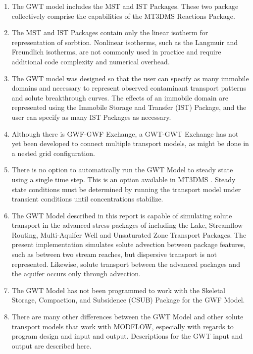 \begin{enumerate}
\item The GWT model includes the MST and IST Packages.  These two package collectively comprise the capabilities of the MT3DMS Reactions Package.

\item The MST and IST Packages contain only the linear isotherm for representation of sorbtion.    Nonlinear isotherms, such as the Langmuir and Freundlich isotherms, are not commonly used in practice and require additional code complexity and numerical overhead. 

\item The GWT model was designed so that the user can specify as many immobile domains and necessary to represent observed contaminant transport patterns and solute breakthrough curves.  The effects of an immobile domain are represented using the Immobile Storage and Transfer (IST) Package, and the user can specify as many IST Packages as necessary.  

\item Although there is GWF-GWF Exchange, a GWT-GWT Exchange has not yet been developed to connect multiple transport models, as might be done in a nested grid configuration.  

\item There is no option to automatically run the GWT Model to steady state using a single time step.  This is an option available in MT3DMS \citep{zheng2010supplemental}.  Steady state conditions must be determined by running the transport model under transient conditions until concentrations stabilize.

\item The GWT Model described in this report is capable of simulating solute transport in the advanced stress packages of \mfcomma including the Lake, Streamflow Routing, Multi-Aquifer Well and Unsaturated Zone Transport Packages.  The present implementation simulates solute advection between package features, such as between two stream reaches, but dispersive transport is not represented.  Likewise, solute transport between the advanced packages and the aquifer occurs only through advection.

\item The GWT Model has not been programmed to work with the Skeletal Storage, Compaction, and Subsidence (CSUB) Package for the GWF Model.  

\item There are many other differences between the \mf GWT Model and other solute transport models that work with MODFLOW, especially with regards to program design and input and output.  Descriptions for the GWT input and output are described here.

\end{enumerate}


